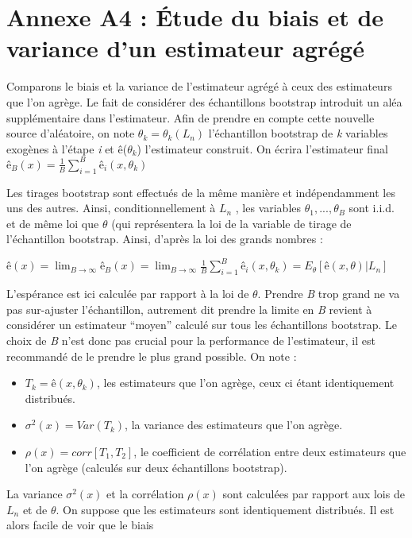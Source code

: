 \chapter*{Annexe A4 : Étude du biais et de variance d'un estimateur agrégé \cite{ESL}}
	\begin{small}
	Comparons le biais et la variance de l’estimateur agrégé à ceux des estimateurs que l’on agrège.
	Le fait de considérer des échantillons bootstrap introduit un aléa supplémentaire dans l’estimateur. Afin de prendre en compte cette nouvelle source d’aléatoire, on note $\theta_k = \theta_k(L_n)$ l’échantillon bootstrap de \textit{k} variables exogènes à l’étape \textit{i} et ê($\theta_k$) l’estimateur construit. On écrira l'estimateur final ${ê_B(x) =  \frac{1}{B} \sum_{i=1}^{B} ê_i(x,\theta_k)}$
	\par
	Les tirages bootstrap sont effectués de la même manière et indépendamment les uns des autres.
	Ainsi, conditionnellement à $L_n$ , les variables $\theta_1,..., \theta_B$ sont i.i.d. et de même loi que $\theta$ (qui représentera la loi de la variable de tirage de l’échantillon bootstrap. Ainsi, d’après la loi des grands nombres :
	\begin{center}
		${ê(x) = \lim_{B \to \infty} ê_B(x) = \lim_{B \to \infty} \frac{1}{B} \sum_{i=1}^{B} ê_i(x,\theta_k) = E_\theta[ê(x,\theta) | L_n]  }$
	\end{center}
	L’espérance est ici calculée par rapport à la loi de $\theta$. Prendre \textit{B} trop grand ne va pas sur-ajuster l’échantillon, autrement dit prendre la limite en \textit{B} revient à considérer un estimateur “moyen” calculé sur tous les échantillons bootstrap. Le choix de \textit{B} n’est donc pas crucial pour la performance de l’estimateur, il est recommandé de le prendre le plus grand possible. On note :
	\begin{itemize}
	\item ${T_k=ê(x,\theta_k)}$, les estimateurs que l'on agrège, ceux ci étant identiquement distribués.
	\item ${\sigma^2(x) = Var (T_k)}$, la variance des estimateurs que l'on agrège.
	\item ${\rho(x) = corr[T_1,T_2]}$, le coefficient de corrélation entre deux estimateurs que l’on agrège (calculés sur deux échantillons bootstrap).
	\end{itemize}
	La variance ${\sigma^2(x)}$ et la corrélation ${\rho(x)}$ sont calculées par rapport aux lois de \textit{$L_n$} et de $\theta$. On suppose que les estimateurs sont identiquement distribués. Il est alors facile de voir que le biais

\end{small}
